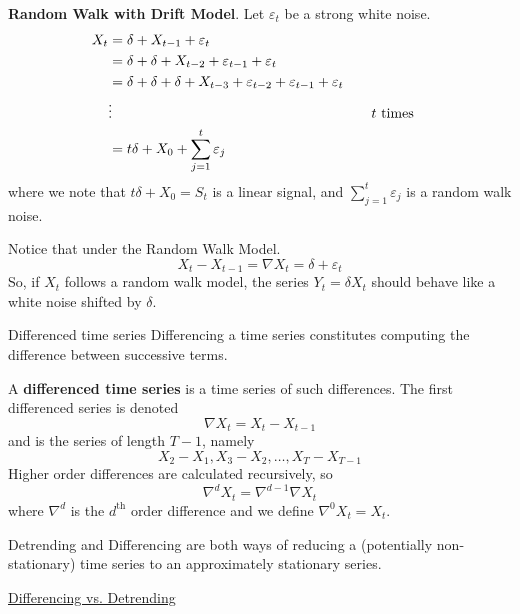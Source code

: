 \textbf{Random Walk with Drift Model}. Let $ \varepsilon_t $ be a strong white noise.
\begin{align*}
    X_t
     & =\delta+X_{t-1}+\varepsilon_t                                                                                  \\
     & =\delta+\delta+X_{t-2}+\varepsilon_{t-1}+\varepsilon_t                                                         \\
     & =\delta+\delta+\delta+X_{t-3}+\varepsilon_{t-2}+\varepsilon_{t-1}+\varepsilon_{t}                              \\
     & \vdots                                                                            & \quad & \text{$ t $ times} \\
     & =t\delta+X_0+\sum_{j=1}^{t} \varepsilon_j
\end{align*}
where we note that $ t\delta+X_0=S_t $ is a linear signal,
and $ \sum_{j=1}^{t} \varepsilon_j $ is a
random walk noise.

Notice that under the Random Walk Model.
\[ X_t-X_{t-1}=\nabla X_t=\delta+\varepsilon_t \]
So, if $ X_t $ follows a random walk model, the series $ Y_t=\delta X_t $
should behave like a white noise shifted by $ \delta $.

\begin{Definition}{Differenced time series}{}
    Differencing a time series constitutes
    computing the difference between successive terms.

    A \textbf{differenced time series} is a time series of such differences.
    The first differenced series is denoted
    \[ \nabla X_t=X_t-X_{t-1} \]
    and is the series of length $ T-1 $, namely
    \[ X_2-X_1,X_3-X_2,\ldots,X_T-X_{T-1} \]
    Higher order differences are calculated recursively, so
    \[ \nabla^d X_t=\nabla^{d-1}\nabla X_t \]
    where $ \nabla^d $ is the $ d^{\text{th}} $ order difference and
    we define $ \nabla^0 X_t=X_t $.
\end{Definition}

Detrending and Differencing are both ways of reducing a
(potentially non-stationary) time series
to an approximately stationary series.

\underline{Differencing vs. Detrending}

